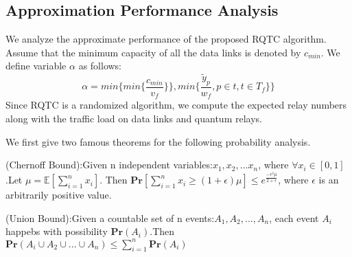 \subsection{Approximation Performance Analysis}
We analyze the approximate performance of the proposed RQTC algorithm. Assume that the minimum capacity of all the data links is denoted by $c_{min}$. We define variable $\alpha$ as follows:
\begin{equation}\label{alpha}
  \alpha = min\{min\{\frac{c_{min}}{v_f}\}\},min\{\frac{\widetilde{y}_p}{w_f},p \in t,t \in T_f\}\}
\end{equation}
Since RQTC is a randomized algorithm, we compute the expected relay numbers along with the traffic load on data links and quantum relays.


We first give two famous theorems for the following probability analysis.
\begin{lemma}\label{chernoff}
(Chernoff Bound):Given n independent variables:$x_1,x_2,...x_n$, where $\forall x_i \in [0,1]$.Let $\mu = \mathbb{E}[\sum_{i=1}^{n}x_i]$. Then $\textbf{Pr}[\sum_{i=1}^{n}x_i \ge (1+\epsilon)\mu] \le e^{\frac{-\epsilon^2\mu}{2+\epsilon}}$, where $\epsilon$ is an arbitrarily positive value.
\end{lemma}

\begin{lemma}
(Union Bound):Given a countable set of n events:$A_1,A_2,...,A_n$, each event $A_i$ happebs with possibility $\textbf{Pr}(A_i)$.Then $\textbf{Pr}(A_i \cup A_2 \cup... \cup A_n) \le \sum_{i=1}^{n}\textbf{Pr}(A_i)$
\end{lemma}


